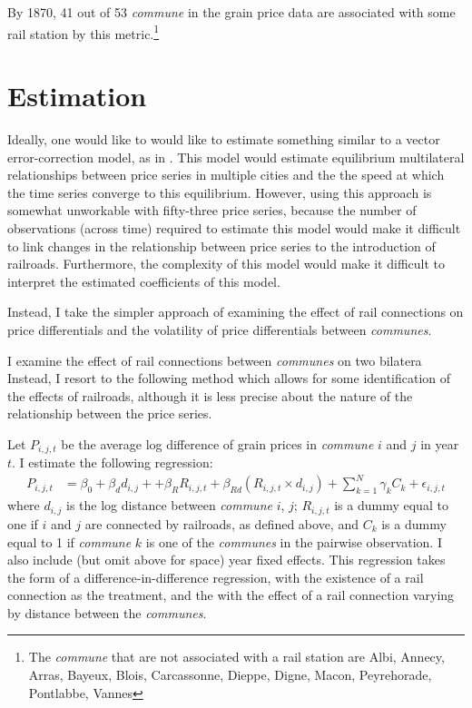 \documentclass[12pt,twoside]{article}
\begin{document}
By 1870, 41 out of 53 \emph{commune} in the grain price data are associated with some rail station by this metric.\footnote{The \emph{commune} that are not associated with a rail station are Albi, Annecy, Arras, Bayeux, Blois, Carcassonne, Dieppe, Digne, Macon, Peyrehorade, Pontlabbe, Vannes}
	
\section{Estimation}

Ideally, one would like to would like to estimate something similar to a vector error-correction model, as in \cite{johansen}.
This model would estimate equilibrium multilateral relationships between price series in multiple cities and the the speed at which the time series converge to this equilibrium.
However, using this approach is somewhat unworkable with fifty-three price series, because the number of observations (across time) required to estimate this model would make it difficult to link changes in the relationship between price series to the introduction of railroads.
Furthermore, the complexity of this model would make it difficult to interpret the estimated coefficients of this model.

Instead, I take the simpler approach of examining the effect of rail connections on price differentials and the volatility of price differentials between \emph{communes}.

I examine the effect of rail connections between \emph{communes} on two bilatera
Instead, I resort to the following method which allows for some identification of the effects of railroads, although it is less precise about the nature of the relationship between the price series.

Let $P_{i,j,t}$ be the average log difference of grain prices in \emph{commune} $i$ and $j$  in year $t$. I estimate the following regression:
\begin{align}
	P_{i,j,t} &= \beta_0 + \beta_d d_{i,j} + + \beta_R R_{i,j,t} + \beta_{Rd} (R_{i,j,t} \times d_{i,j}) + \sum_{k=1}^{N} \gamma_k C_k + \epsilon_{i,j,t} \label{eq:reg1}
\end{align}
where $d_{i,j}$ is the log distance between \emph{commune} $i$, $j$; $R_{i,j,t}$ is a dummy equal to one if $i$ and $j$ are connected by railroads, as defined above, and $C_k$ is a dummy equal to 1 if \emph{commune} $k$ is one of the \emph{communes} in the pairwise observation.
I also include (but omit above for space) year fixed effects.
This regression takes the form of a difference-in-difference regression, with the existence of a rail connection as the treatment, and the with the effect of a rail connection varying by distance between the \emph{communes}.
\end{document}
